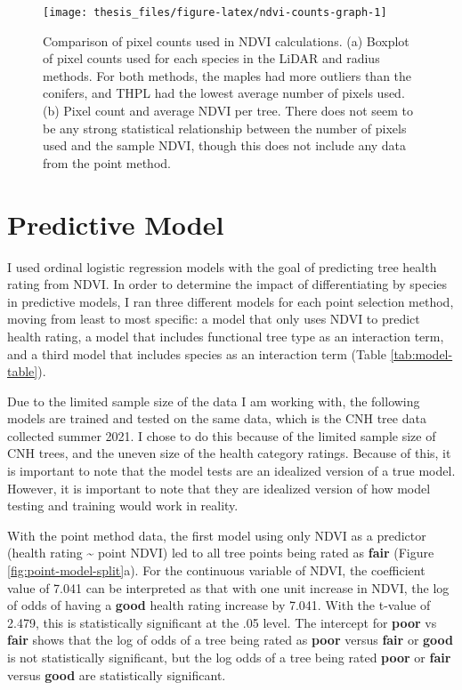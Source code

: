 \documentclass[12pt,twoside]{reedthesis}
\begin{document}
\begin{figure}

{\centering \texttt{[image: thesis\_files/figure-latex/ndvi-counts-graph-1]} 

}

\caption[Pixel counts for NDVI calculation, by method, and for sample NDVI.]{Comparison of pixel counts used in NDVI calculations. (a) Boxplot of pixel counts used for each species in the LiDAR and radius methods. For both methods, the maples had more outliers than the conifers, and THPL had the lowest average number of pixels used. (b) Pixel count and average NDVI per tree. There does not seem to be any strong statistical relationship between the number of pixels used and the sample NDVI, though this does not include any data from the point method.}\label{fig:ndvi-counts-graph}
\end{figure}
\hypertarget{predictive-model}{%
\section{Predictive Model}\label{predictive-model}}

I used ordinal logistic regression models with the goal of predicting
tree health rating from NDVI. In order to determine the impact of
differentiating by species in predictive models, I ran three different
models for each point selection method, moving from least to most
specific: a model that only uses NDVI to predict health rating, a model
that includes functional tree type as an interaction term, and a third
model that includes species as an interaction term (Table
\ref{tab:model-table}).

Due to the limited sample size of the data I am working with, the
following models are trained and tested on the same data, which is the
CNH tree data collected summer 2021. I chose to do this because of the
limited sample size of CNH trees, and the uneven size of the health
category ratings. Because of this, it is important to note that the
model tests are an idealized version of a true model. However, it is
important to note that they are idealized version of how model testing
and training would work in reality.

With the point method data, the first model using only NDVI as a
predictor (health rating \textasciitilde{} point NDVI) led to all tree points being
rated as \textbf{fair} (Figure \ref{fig:point-model-split}a). For the
continuous variable of NDVI, the coefficient value of 7.041 can be
interpreted as that with one unit increase in NDVI, the log of odds of
having a \textbf{good} health rating increase by 7.041. With the t-value of
2.479, this is statistically significant at the .05 level. The intercept
for \textbf{poor} vs \textbf{fair} shows that the log of odds of a tree being
rated as \textbf{poor} versus \textbf{fair} or \textbf{good} is not statistically
significant, but the log odds of a tree being rated \textbf{poor} or \textbf{fair}
versus \textbf{good} are statistically significant.
\end{document}
